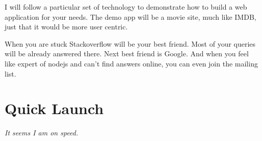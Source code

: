 \documentclass[12pt]{book}
\begin{document}

I will follow a particular set of technology to demonstrate how to build a web application for your needs. The demo app will be a movie site, much like IMDB, just that it would be more user centric.

When you are stuck Stackoverflow will be your best friend. Most of your queries will be already answered there. Next best friend is Google. And when you feel like expert of nodejs and can't find answers online, you can even join the mailing list.




\chapter{Quick Launch}
\begin{flushright}\textit{It seems I am on speed.}\end{flushright}
\end{document}
